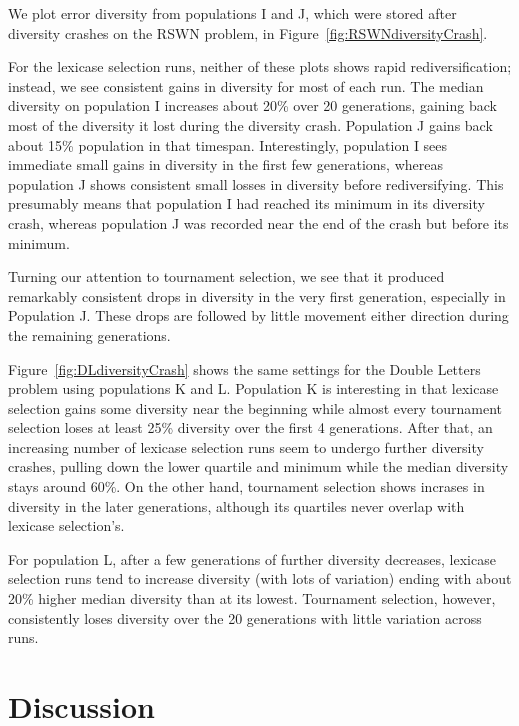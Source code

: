 \documentclass{sig-alternate-05-2015}
\begin{document}
We plot error diversity from populations I and J, which were stored after diversity crashes on the RSWN problem, in Figure~\ref{fig:RSWNdiversityCrash}. 

For the lexicase selection runs, neither of these plots shows rapid rediversification; instead, we see consistent gains in diversity for most of each run.
The median diversity on population I increases about 20\% over 20 generations, gaining back most of the diversity it lost during the diversity crash. Population J gains back about 15\% population in that timespan.
Interestingly, population I sees immediate small gains in diversity in the first few generations, whereas population J shows consistent small losses in diversity before rediversifying. This presumably means that population I had reached its minimum in its diversity crash, whereas population J was recorded near the end of the crash but before its minimum.

Turning our attention to tournament selection, we see that it produced remarkably consistent drops in diversity in the very first generation, especially in Population J. These drops are followed by little movement either direction during the remaining generations.

Figure~\ref{fig:DLdiversityCrash} shows the same settings for the Double Letters problem using populations K and L. Population K is interesting in that lexicase selection gains some diversity near the beginning while almost every tournament selection loses at least 25\% diversity over the first 4 generations. After that, an increasing number of lexicase selection runs seem to undergo further diversity crashes, pulling down the lower quartile and minimum while the median diversity stays around 60\%. On the other hand, tournament selection shows incrases in diversity in the later generations, although its quartiles never overlap with lexicase selection's.

For population L, after a few generations of further diversity decreases, lexicase selection runs tend to increase diversity (with lots of variation) ending with about 20\% higher median diversity than at its lowest. Tournament selection, however, consistently loses diversity over the 20 generations with little variation across runs.

\section{Discussion}
\end{document}
